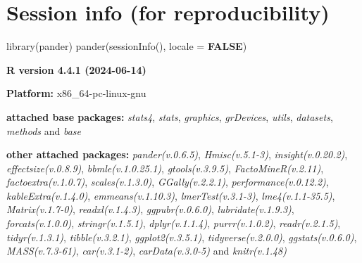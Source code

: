 \documentclass[
  bookmarksnumbered]{article}
\newenvironment{Shaded}{\begin{snugshade}}{\end{snugshade}}
\newcommand{\AttributeTok}[1]{\textcolor[rgb]{0.80,0.80,0.80}{#1}}
\newcommand{\ConstantTok}[1]{\textcolor[rgb]{0.86,0.64,0.64}{\textbf{#1}}}
\newcommand{\FunctionTok}[1]{\textcolor[rgb]{0.94,0.94,0.56}{#1}}
\newcommand{\NormalTok}[1]{\textcolor[rgb]{0.80,0.80,0.80}{#1}}
\begin{document}
\section{Session info (for reproducibility)}\label{session}

\begin{Shaded}
\begin{Highlighting}[]
\FunctionTok{library}\NormalTok{(pander)}
\FunctionTok{pander}\NormalTok{(}\FunctionTok{sessionInfo}\NormalTok{(), }\AttributeTok{locale =} \ConstantTok{FALSE}\NormalTok{)}
\end{Highlighting}
\end{Shaded}

\textbf{R version 4.4.1 (2024-06-14)}

\textbf{Platform:} x86\_64-pc-linux-gnu

\textbf{attached base packages:}
\emph{stats4}, \emph{stats}, \emph{graphics}, \emph{grDevices}, \emph{utils}, \emph{datasets}, \emph{methods} and \emph{base}

\textbf{other attached packages:}
\emph{pander(v.0.6.5)}, \emph{Hmisc(v.5.1-3)}, \emph{insight(v.0.20.2)}, \emph{effectsize(v.0.8.9)}, \emph{bbmle(v.1.0.25.1)}, \emph{gtools(v.3.9.5)}, \emph{FactoMineR(v.2.11)}, \emph{factoextra(v.1.0.7)}, \emph{scales(v.1.3.0)}, \emph{GGally(v.2.2.1)}, \emph{performance(v.0.12.2)}, \emph{kableExtra(v.1.4.0)}, \emph{emmeans(v.1.10.3)}, \emph{lmerTest(v.3.1-3)}, \emph{lme4(v.1.1-35.5)}, \emph{Matrix(v.1.7-0)}, \emph{readxl(v.1.4.3)}, \emph{ggpubr(v.0.6.0)}, \emph{lubridate(v.1.9.3)}, \emph{forcats(v.1.0.0)}, \emph{stringr(v.1.5.1)}, \emph{dplyr(v.1.1.4)}, \emph{purrr(v.1.0.2)}, \emph{readr(v.2.1.5)}, \emph{tidyr(v.1.3.1)}, \emph{tibble(v.3.2.1)}, \emph{ggplot2(v.3.5.1)}, \emph{tidyverse(v.2.0.0)}, \emph{ggstats(v.0.6.0)}, \emph{MASS(v.7.3-61)}, \emph{car(v.3.1-2)}, \emph{carData(v.3.0-5)} and \emph{knitr(v.1.48)}
\end{document}
